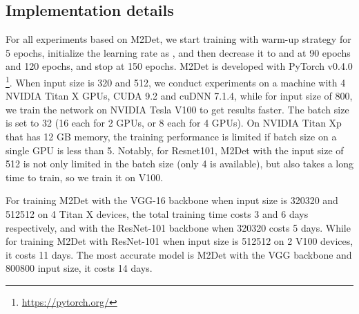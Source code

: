 \documentclass[letterpaper]{article} \usepackage{aaai18}  \usepackage{times}  \usepackage{helvet}  \usepackage{courier}  \usepackage{url}  \usepackage{graphicx}
\begin{document}
\subsection{Implementation details}
For all experiments based on M2Det, we start training with warm-up strategy for 5 epochs, initialize the learning rate as , and then decrease it to  and  at 90 epochs and 120 epochs, and stop at 150 epochs. M2Det is developed with PyTorch v0.4.0 \footnote{\url{https://pytorch.org/}}. When input size is 320 and 512, we conduct experiments on a machine with 4 NVIDIA Titan X GPUs, CUDA 9.2 and cuDNN 7.1.4, while for input size of 800, we train the network on NVIDIA Tesla V100 to get results faster. The batch size is set to 32 (16 each for 2 GPUs, or 8 each for 4 GPUs). On NVIDIA Titan Xp that has 12 GB memory, the training performance is limited if batch size on a single GPU is less than 5. Notably, for Resnet101, M2Det with the input size of 512 is not only limited in the batch size (only 4 is available), but also takes a long time to train, so we train it on V100.

For training M2Det with the VGG-16 backbone when input size is 320320 and 512512 on 4 Titan X devices, the total training time costs 3 and 6 days respectively, and with the ResNet-101 backbone when 320320 costs 5 days. While for training M2Det with ResNet-101 when input size is 512512 on 2 V100 devices, it costs 11 days. The most accurate model is M2Det with the VGG backbone and 800800 input size, it costs 14 days.
\end{document}
